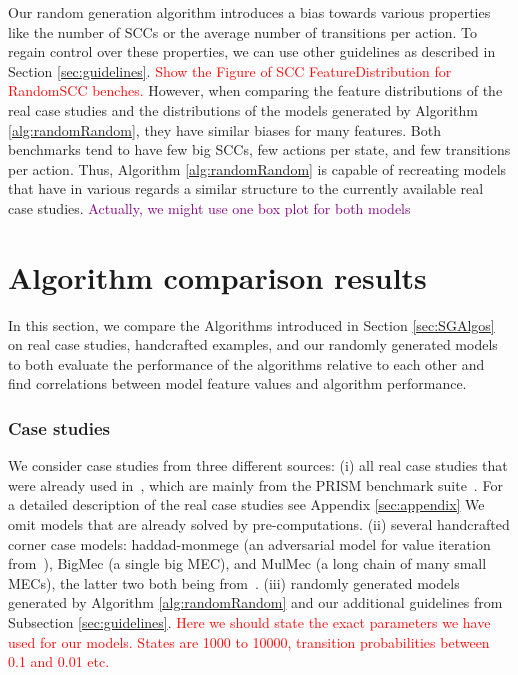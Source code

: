 Our random generation algorithm introduces a bias towards various properties like the number of SCCs or the average number of transitions per action. 
To regain control over these properties, we can use other guidelines as described in Section \ref{sec:guidelines}.
\textcolor{red}{Show the Figure of SCC FeatureDistribution for RandomSCC benches.}
However, when comparing the feature distributions of the real case studies and the distributions of the models generated by Algorithm \ref{alg:randomRandom},
they have similar biases for many features. Both benchmarks tend to have few big SCCs, few actions per state, and few transitions per action.
Thus, Algorithm \ref{alg:randomRandom} is capable of recreating models that have in various regards a similar structure to the currently available real case studies. 
\textcolor{purple}{Actually, we might use one box plot for both models}

\section{Algorithm comparison results}

In this section, we compare the Algorithms introduced in Section \ref{sec:SGAlgos} on real case studies, handcrafted examples, and our randomly generated models to both evaluate the 
performance of the algorithms relative to each other and find correlations between model feature values and algorithm performance.

\subsubsection*{Case studies}
We consider case studies from three different sources: 
(i) all real case studies that were already used in~\cite{gandalf}, which are mainly from the PRISM benchmark suite~\cite{PRISMben}.
For a detailed description of the real case studies see Appendix \ref{sec:appendix}
We omit models that are already solved by pre-computations.
(ii) several handcrafted corner case models: haddad-monmege (an adversarial model for value iteration from~\cite{haddadmonmege}), BigMec (a single big MEC), and MulMec (a long chain of many small MECs), the latter two both being from~\cite{gandalf}.
(iii) randomly generated models generated by Algorithm \ref{alg:randomRandom} and our additional guidelines from Subsection \ref{sec:guidelines}.
\textcolor{red}{Here we should state the exact parameters we have used for our models. States are 1000 to 10000, transition probabilities between 0.1 and 0.01 etc.}

